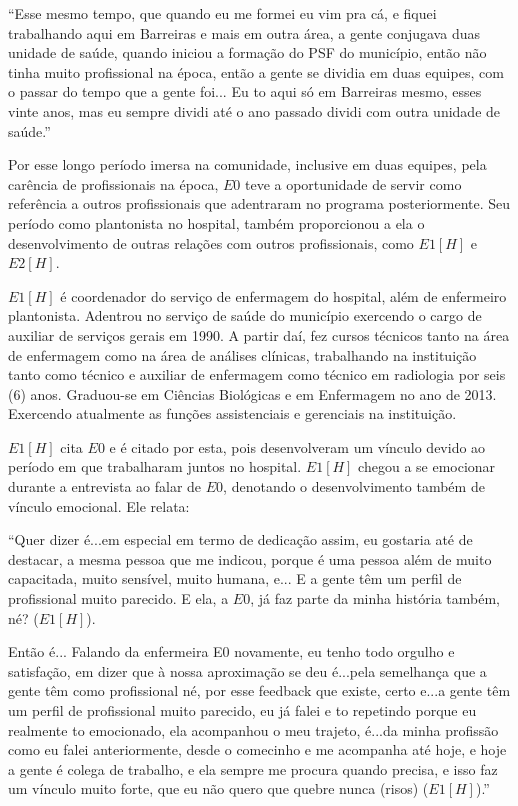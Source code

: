 \begin{citacao}
``Esse mesmo tempo, que quando eu me formei eu vim pra cá, e fiquei trabalhando aqui em Barreiras e mais em outra área, a gente conjugava duas unidade de saúde, quando iniciou a formação do PSF do município, então não tinha muito profissional na época, então a gente se dividia em duas equipes, com o passar do tempo que a gente foi... Eu to aqui só em Barreiras mesmo, esses vinte anos, mas eu sempre dividi até o ano passado dividi com outra unidade de saúde.''
\end{citacao}

Por esse longo período imersa na comunidade, inclusive em duas equipes, pela carência de profissionais na época, $E0$ teve a oportunidade de servir como referência a outros profissionais que adentraram no programa posteriormente. Seu período como plantonista no hospital, também proporcionou a ela o desenvolvimento de outras relações com outros profissionais, como $E1 [H]$ e $E2 [H]$.

$E1[H]$ é coordenador do serviço de enfermagem do hospital, além de enfermeiro plantonista. Adentrou no serviço de saúde do município exercendo o cargo de auxiliar de serviços gerais em 1990. A partir daí, fez cursos técnicos tanto na área de enfermagem como na área de análises clínicas, trabalhando na instituição tanto como técnico e auxiliar de enfermagem como técnico em radiologia por seis (6) anos. Graduou-se em Ciências Biológicas e em Enfermagem no ano de 2013. Exercendo atualmente as funções assistenciais e gerenciais na instituição.

$E1[H]$ cita $E0$ e é citado por esta, pois desenvolveram um vínculo devido ao período em que trabalharam juntos no hospital. $E1[H]$ chegou a se emocionar durante a entrevista ao falar de $E0$, denotando o desenvolvimento também de vínculo emocional. Ele relata:

\begin{citacao}
``Quer dizer é...em especial em termo de dedicação assim, eu gostaria até de destacar, a mesma pessoa que me indicou, porque é uma pessoa além de muito capacitada, muito sensível, muito humana, e... E a gente têm um perfil de profissional muito parecido. E ela, a $E0$, já faz parte da minha história também, né? ($E1[H]$).

Então é... Falando da enfermeira E0 novamente, eu tenho todo orgulho e satisfação, em dizer que à nossa aproximação se deu é...pela semelhança que a gente têm como profissional né, por esse feedback que existe, certo e...a gente têm um perfil de profissional muito parecido, eu já falei e to repetindo porque eu realmente to emocionado, ela acompanhou o meu trajeto, é...da minha profissão como eu falei anteriormente, desde o comecinho e me acompanha até hoje, e hoje a gente é colega de trabalho, e ela sempre me procura quando precisa, e isso faz um vínculo muito forte, que eu não quero que quebre nunca (risos) ($E1[H]$).''
\end{citacao}

